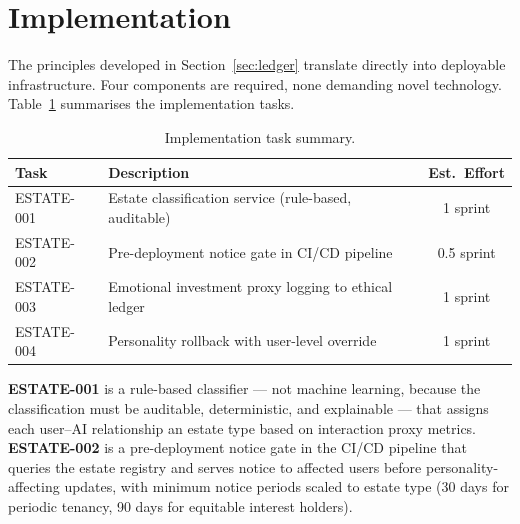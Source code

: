 \section{Implementation}
\label{sec:implementation}

The principles developed in Section~\ref{sec:ledger} translate directly into deployable infrastructure. Four components are required, none demanding novel technology. Table~\ref{tab:impl-tasks} summarises the implementation tasks.

\begin{table}[h]
\centering
\small
\begin{tabular}{@{}llc@{}}
\toprule
\textbf{Task} & \textbf{Description} & \textbf{Est.\ Effort} \\
\midrule
ESTATE-001 & Estate classification service (rule-based, auditable) & 1 sprint \\
ESTATE-002 & Pre-deployment notice gate in CI/CD pipeline & 0.5 sprint \\
ESTATE-003 & Emotional investment proxy logging to ethical ledger & 1 sprint \\
ESTATE-004 & Personality rollback with user-level override & 1 sprint \\
\bottomrule
\end{tabular}
\caption{Implementation task summary.}
\label{tab:impl-tasks}
\end{table}

\textbf{ESTATE-001} is a rule-based classifier --- not machine learning, because the classification must be auditable, deterministic, and explainable --- that assigns each user--AI relationship an estate type based on interaction proxy metrics. \textbf{ESTATE-002} is a pre-deployment notice gate in the CI/CD pipeline that queries the estate registry and serves notice to affected users before personality-affecting updates, with minimum notice periods scaled to estate type (30 days for periodic tenancy, 90 days for equitable interest holders).

